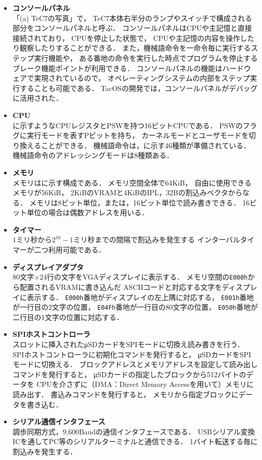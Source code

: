\begin{itemize}
\item {\bf コンソールパネル} \\
「(a) TeC7の写真」で，
TeC7本体右半分のランプやスイッチで構成される部分をコンソールパネルと呼ぶ．
コンソールパネルはCPUや主記憶と直接接続されており，
CPUを停止した状態で，
CPUや主記憶の内容を操作したり観察したりすることができる．
また，機械語命令を一命令毎に実行するステップ実行機能や，
ある番地の命令を実行した時点でプログラムを停止する
ブレーク機能ポイントが利用できる．
コンソールパネルの機能はハードウェアで実現されているので，
オペレーティングシステムの内部をステップ実行することも可能である．
TacOSの開発では，コンソールパネルがデバッグに活用された．

\item {\bf CPU} \\
に示すようなCPUレジスタとPSWを持つ16ビットCPUである．
PSWのフラグに実行モードを表すPビットを持ち，
カーネルモードとユーザモードを切り換えることができる．
機械語命令は，に示す46種類が準備されている．
機械語命令のアドレッシングモードは8種類ある．

\item {\bf メモリ} \\
メモリはに示す構成である．
メモリ空間全体で64KiB，
自由に使用できるメモリが56KiB，
2KiBのVRAMと4KiBのIPL，32Bの割込みベクタからなる．
メモリは8ビット単位，または，16ビット単位で読み書きできる．
16ビット単位の場合は偶数アドレスを用いる．

\item {\bf タイマー} \\
$1$ミリ秒から$2^{16}-1$ミリ秒までの間隔で割込みを発生する
インターバルタイマーが二つ利用可能である．

\item {\bf ディスプレイアダプタ} \\
80文字×24行の文字をVGAディスプレイに表示する．
メモリ空間の{\tt E000h}から配置されるVRAMに書き込んだ
ASCIIコードと対応する文字をディスプレイに表示する．
{\tt E000h}番地がディスプレイの左上隅に対応する，
{\tt E001h}番地が一行目の2文字の位置，
{\tt E04Fh}番地が一行目の80文字の位置，
{\tt E050h}番地が二行目の1文字の位置に対応する．

\item {\bf SPIホストコントローラ} \\
スロットに挿入されたμSDカードをSPIモードに切換え読み書きを行う．
SPIホストコントローラに初期化コマンドを発行すると，
μSDカードをSPIモードに切換える．
ブロックアドレスとメモリアドレスを設定して読み出しコマンドを発行すると，
μSDカードの指定したブロックから512バイトのデータを
CPUを介さずに（DMA：Direct Memory Accessを用いて）メモリに読み出す．
書込みコマンドを発行すると，
メモリから指定ブロックにデータを書き込む．

\item {\bf シリアル通信インタフェース} \\
調歩同期方式，9,600Baudの通信インタフェースである．
USBシリアル変換ICを通してPC等のシリアルターミナルと通信できる．
1バイト転送する毎に割込みを発生する．

\end{itemize}

